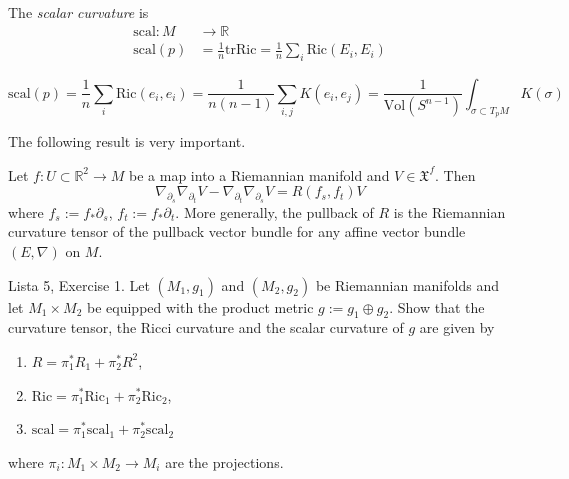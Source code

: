 The {\it scalar curvature} is
\begin{equation}
\label{equation-scalar-curvature}
\begin{aligned}
\text{scal}: M &\longrightarrow \mathbb{R} \\
\text{scal}(p)&=\frac{1}{n}\text{tr}\text{Ric}
=\frac{1}{n}\sum_i\text{Ric}(E_i,E_i)
\end{aligned}
\end{equation}

\begin{lemma}
\label{lemma-scalar-curvature-is-mean-of-sectional}
$$
\text{scal}(p)=\frac{1}{n}\sum_{i}\text{Ric}(e_i,e_i)
=\frac{1}{n(n-1)}\sum_{i,j}K(e_i,e_j)
=\frac{1}{\text{Vol}(S^{n-1})}\int_{\sigma\subset T_pM}K(\sigma)
$$
\end{lemma}

\medskip\noindent
The following result is very important.

\begin{lemma}
\label{lemma-symmetry-lemma-curvature}
Let $f:U \subset \mathbb{R}^2 \to M$
be a map into a Riemannian manifold and $V \in \mathfrak{X}^f$.
Then
$$
\nabla_{\partial_s}\nabla_{\partial_t}V
-\nabla_{\partial_t}\nabla_{\partial_s}V
=R(f_s,f_t)V
$$
where $f_s:=f_*\partial_s$, $f_t:=f_*\partial_t$.
More generally, the pullback of $R$ is the
Riemannian curvature tensor of the pullback vector bundle
for any affine vector bundle $(E,\nabla)$ on $M$.
\end{lemma}


\begin{exercise}
\label{lemma-curvatures-of-product-metric}
Lista 5, Exercise 1. Let $(M_1,g_1)$ and $(M_2,g_2)$ be Riemannian manifolds and
let $M_1\times M_2$ be equipped with the product metric $g:=g_1\oplus g_2$. Show
that the curvature tensor, the Ricci curvature and the scalar curvature of $g$
are given by
\begin{enumerate}
\item $R=\pi_1^*R_1+\pi_2^*R^2$,
\item $\text{Ric}=\pi_1^*\text{Ric}_1+\pi_2^*\text{Ric}_2$,
\item $\text{scal}=\pi_1^*\text{scal}_1+\pi_2^*\text{scal}_2$
\end{enumerate}
where $\pi_i:M_1\times M_2\to M_i$ are the projections.
\end{exercise}

